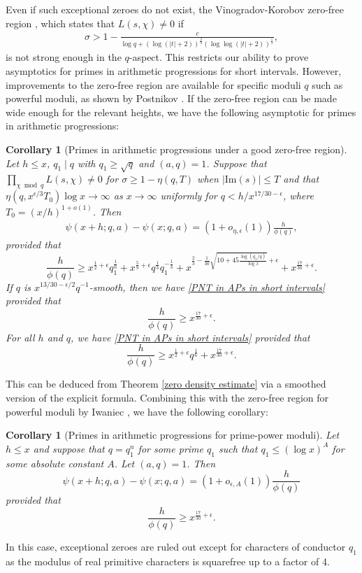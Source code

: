 \documentclass[12pt]{amsart}
\newtheorem{corollary}[theorem]{Corollary}
\theoremstyle{definition}
\theoremstyle{plain}
\theoremstyle{remark}
\numberwithin{equation}{section}
\numberwithin{theorem}{section}
\numberwithin{equation}{section}
\begin{document}
	Even if such exceptional zeroes do not exist, the Vinogradov-Korobov zero-free region \cite[p. 176]{Montgomery1994}, which states that $L(s,\chi) \neq 0$ if
	\begin{align*}
		\sigma > 1 -\frac{c}{\log{q}+(\log (|t|+2))^{\frac{2}{3}}(\log\log (|t|+2))^{\frac{1}{3}}},
	\end{align*}
	is not strong enough in the $q$-aspect. This restricts our ability to prove asymptotics for primes in arithmetic progressions for short intervals. However, improvements to the zero-free region are available for specific moduli $q$ such as powerful moduli, as shown by Postnikov \cite{Postnikov1956}. If the zero-free region can be made wide enough for the relevant heights, we have the following asymptotic for primes in arithmetic progressions:
	\begin{corollary}[Primes in arithmetic progressions under a good zero-free region]
		Let \(h\leq x\),
		\(q_1\mid q\) with \(q_1\geq \sqrt q\) and \((a,q)=1\). Suppose that
		$\prod_{\chi \bmod q} L(s,\chi)\neq 0$ for $\sigma\geq 1-\eta(q,T)$ when $|\text{Im}(s)| \le T$ and that $\eta(q,x^{\epsilon/3}T_0) \log x \to \infty$ as $x \to \infty$ uniformly for $q < h/x^{17/30-\epsilon}$, where $T_0=(x/h)^{1+o(1)}$. Then
		\begin{align}
			\psi(x+h;q,a)-\psi(x;q,a)
			=
			(1+o_{\eta,\epsilon}(1))\frac{h}{\phi(q)}, \label{PNT in APs in short intervals}
		\end{align}
		provided that
		\[
		\frac{h}{\phi(q)}
		\geq
		x^{\frac12+\epsilon}q_1^{\frac16}
		+
		x^{\frac59+\epsilon}q^{\frac13}q_1^{-\frac13}
		+
		x^{
			\frac23
			-
			\frac{1}{30}
			\sqrt{
				10+45\frac{\log(q_1/q)}{\log x}
			}
			+\epsilon
		}
		+
		x^{\frac{17}{30}+\epsilon}.
		\]
		If \(q\) is
		\( x^{13/30-\epsilon/2}q^{-1}\)-smooth, then we have \eqref{PNT in APs in short intervals} provided that
		\[
		\frac{h}{\phi(q)}\geq x^{\frac{17}{30}+\epsilon}.
		\]
		For all \(h\) and \(q\), we have \eqref{PNT in APs in short intervals} provided that
		\[
		\frac{h}{\phi(q)}
		\geq
		x^{\frac12+\epsilon}q^{\frac16}
		+
		x^{\frac{17}{30}+\epsilon}.
		\]
	\end{corollary}
	This can be deduced from Theorem \ref{zero density estimate} via a smoothed version of the explicit formula. Combining this with the zero-free region for powerful moduli by Iwaniec \cite{Iwaniec1974}, we have the following corollary:
	\begin{corollary}[Primes in arithmetic progressions for prime-power moduli]
		Let \(h\leq x\) and suppose that $q=q_1^n$
		for some prime \(q_1\) such that $q_1\leq (\log x)^A$ for some absolute constant \(A\). Let \((a,q)=1\). Then
		\[
		\psi(x+h;q,a)-\psi(x;q,a)
		=
		(1+o_{\epsilon,A}(1))\frac{h}{\phi(q)}
		\]
		provided that
		\[
		\frac{h}{\phi(q)}
		\geq x^{\frac{17}{30}+\epsilon}.
		\]
	\end{corollary}
	In this case, exceptional zeroes are ruled out except for characters of conductor $q_1$ as the modulus of real primitive characters is squarefree up to a factor of 4.
	
\end{document}
